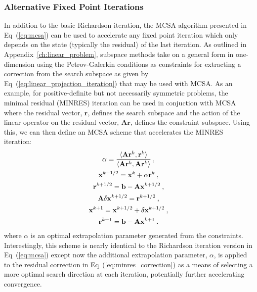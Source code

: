 \subsubsection{Alternative Fixed Point Iterations}
\label{subsubsec:alternative_fixed_point}
In addition to the basic Richardson iteration, the MCSA algorithm
presented in Eq~(\ref{eq:mcsa}) can be used to accelerate any fixed
point iteration which only depends on the state (typically the
residual) of the last iteration. As outlined in
Appendix~\ref{ch:linear_problem}, subspace methods take on a general
form in one-dimension using the Petrov-Galerkin conditions as
constraints for extracting a correction from the search subspace as
given by Eq~(\ref{eq:linear_projection_iteration}) that may be used
with MCSA. As an example, for positive-definite but not necessarily
symmetric problems, the minimal residual (MINRES) iteration
\citep{saad_iterative_2003} can be used in conjuction with MCSA where
the residual vector, $\mathbf{r}$, defines the search subspace and the
action of the linear operator on the residual vector,
$\mathbf{A}\mathbf{r}$, defines the constraint subspace. Using this,
we can then define an MCSA scheme that accelerates the MINRES
iteration:
\begin{subequations}
  \begin{gather}
    \alpha = \frac{\langle \mathbf{A}\mathbf{r}^k, \mathbf{r}^k
      \rangle}{\langle \mathbf{A}\mathbf{r}^k, \mathbf{A}\mathbf{r}^k
      \rangle}\:, \\
    \mathbf{x}^{k+1/2} = \mathbf{x}^k + \alpha \mathbf{r}^k\:,
    \label{eq:minres_correction}\\
    \mathbf{r}^{k+1/2} = \mathbf{b} - \mathbf{A}\mathbf{x}^{k+1/2}\:,\\ 
    \mathbf{A}\delta\mathbf{x}^{k+1/2} = \mathbf{r}^{k+1/2}\:,\\ 
    \mathbf{x}^{k+1} = \mathbf{x}^{k+1/2} + \delta\mathbf{x}^{k+1/2}\:,\\ 
    \mathbf{r}^{k+1} = \mathbf{b} - \mathbf{A}\mathbf{x}^{k+1}\:.
  \end{gather}
  \label{eq:mcsa_minres}
\end{subequations}
where $\alpha$ is an optimal extrapolation parameter generated from
the constraints. Interestingly, this scheme is nearly identical to the
Richardson iteration version in Eq~(\ref{eq:mcsa}) except now the
additional extrapolation parameter, $\alpha$, is applied to the
residual correction in Eq~(\ref{eq:minres_correction}) as a means of
selecting a more optimal search direction at each iteration,
potentially further accelerating convergence.

